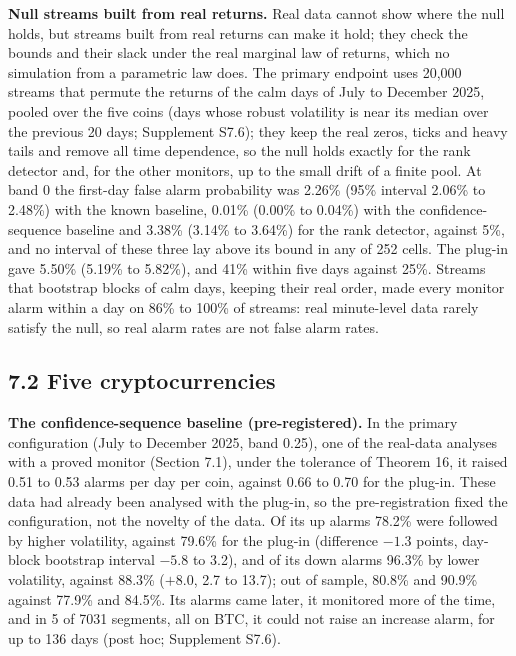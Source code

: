 \documentclass[
]{article}
\begin{document}
\textbf{Null streams built from real returns.} Real data cannot show
where the null holds, but streams built from real returns can make it
hold; they check the bounds and their slack under the real marginal law
of returns, which no simulation from a parametric law does. The primary
endpoint uses 20,000 streams that permute the returns of the calm days
of July to December 2025, pooled over the five coins (days whose robust
volatility is near its median over the previous 20 days; Supplement
S7.6); they keep the real zeros, ticks and heavy tails and remove all
time dependence, so the null holds exactly for the rank detector and,
for the other monitors, up to the small drift of a finite pool. At band
0 the first-day false alarm probability was 2.26\% (95\% interval 2.06\%
to 2.48\%) with the known baseline, 0.01\% (0.00\% to 0.04\%) with the
confidence-sequence baseline and 3.38\% (3.14\% to 3.64\%) for the rank
detector, against 5\%, and no interval of these three lay above its
bound in any of 252 cells. The plug-in gave 5.50\% (5.19\% to 5.82\%),
and 41\% within five days against 25\%. Streams that bootstrap blocks of
calm days, keeping their real order, made every monitor alarm within a
day on 86\% to 100\% of streams: real minute-level data rarely satisfy
the null, so real alarm rates are not false alarm rates.

\hypertarget{five-cryptocurrencies}{%
\subsection{7.2 Five cryptocurrencies}\label{five-cryptocurrencies}}

\textbf{The confidence-sequence baseline (pre-registered).} In the
primary configuration (July to December 2025, band 0.25), one of the
real-data analyses with a proved monitor (Section 7.1), under the
tolerance of Theorem 16, it raised 0.51 to 0.53 alarms per day per coin,
against 0.66 to 0.70 for the plug-in. These data had already been
analysed with the plug-in, so the pre-registration fixed the
configuration, not the novelty of the data. Of its up alarms 78.2\% were
followed by higher volatility, against 79.6\% for the plug-in
(difference \(-1.3\) points, day-block bootstrap interval \(-5.8\) to
3.2), and of its down alarms 96.3\% by lower volatility, against 88.3\%
(\(+8.0\), 2.7 to 13.7); out of sample, 80.8\% and 90.9\% against 77.9\%
and 84.5\%. Its alarms came later, it monitored more of the time, and in
5 of 7031 segments, all on BTC, it could not raise an increase alarm,
for up to 136 days (post hoc; Supplement S7.6).
\end{document}
